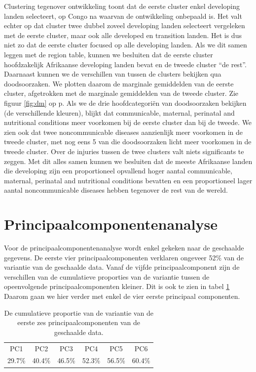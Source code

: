 \documentclass[a4paper,kulak]{kulakarticle}
\begin{document}
Clustering tegenover ontwikkeling toont dat de eerste cluster enkel developing landen selecteert, op Congo na waarvan de ontwikkeling onbepaald is.
Het valt echter op dat cluster twee dubbel zoveel developing landen selecteert vergeleken met de eerste cluster, maar ook alle developed en transition landen.
Het is dus niet zo dat de eerste cluster focused op alle developing landen.
Als we dit samen leggen met de region table, kunnen we besluiten dat de eerste cluster hoofdzakelijk Afrikaanse developing landen bevat en de tweede cluster ``de rest''. \newline
Daarnaast kunnen we de verschillen van tussen de clusters bekijken qua doodsoorzaken.
We plotten daarom de marginale gemiddelden van de eerste cluster, afgetrokken met de marginale gemiddelden van de tweede cluster.
Zie figuur \ref{fig:dm} op p\pageref{fig:dm}.
Als we de drie hoofdcategoriën van doodsoorzaken bekijken (de verschillende kleuren), blijkt dat communicable, maternal, perinatal and nutritional conditions meer voorkomen bij de eerste cluster dan bij de tweede.
We zien ook dat twee noncommunicable diseases aanzienlijk meer voorkomen in de tweede cluster, met nog eens 5 van die doodsoorzaken licht meer voorkomen in de tweede cluster.
Over de injuries tussen de twee clusters valt niets significants te zeggen. \newline
Met dit alles samen kunnen we besluiten dat de meeste Afrikaanse landen die developing zijn een proportioneel opvallend hoger aantal  communicable, maternal, perinatal and nutritional conditions bevatten en een proportioneel lager aantal noncommunicable diseases hebben tegenover de rest van de wereld.


\section{Principaalcomponentenanalyse}

Voor de principaalcomponentenanalyse wordt enkel gekeken naar de geschaalde gegevens. De eerste vier principaalcomponenten verklaren ongeveer 52\% van de variantie van de geschaalde data. Vanaf de vijfde principaalcomponent zijn de verschillen van de cumulatieve proporties van de variantie tussen de opeenvolgende principaalcomponenten kleiner. Dit is ook te zien in tabel \ref{table:pca} Daarom gaan we hier verder met enkel de vier eerste principaal componenten.

\begin{table}[ht]
	\centering
\begin{tabular}{cccccc}
	\hline 
	PC1 & PC2 & PC3 & PC4 & PC5 & PC6 \\ 
	29.7\% & 40.4\% & 46.5\% & 52.3\% & 56.5\% & 60.4\%\\ 
	\hline 
\end{tabular} 
\caption{De cumulatieve proportie van de variantie van de eerste zes principaalcomponenten van de geschaalde data.}
\label{table:pca}
\end{table}
\end{document}

